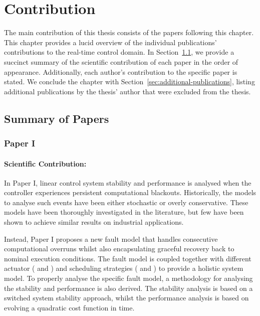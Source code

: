 \chapter{Contribution}%
\label{ch:contribution}%
%

The main contribution of this thesis consists of the  papers following this chapter.
This chapter provides a lucid overview of the individual publications' contributions to the real-time control domain.
In Section~\ref{sec:paper-summaries}, we provide a succinct summary of the scientific contribution of each paper in the order of appearance.
Additionally, each author's contribution to the specific paper is stated.
We conclude the chapter with Section~\ref{sec:additional-publications}, listing additional publications by the thesis' author that were excluded from the thesis.

\clearpage %

\section{Summary of Papers}%
\label{sec:paper-summaries}%
%
\subsection*{Paper I}%
%
\begin{quote}
\end{quote}

\subsubsection*{Scientific Contribution:}%
%
In Paper I, linear control system stability and performance is analysed when the controller experiences persistent computational blackouts.
Historically, the models to analyse such events have been either stochastic or overly conservative.
These models have been thoroughly investigated in the literature, but few have been shown to achieve similar results on industrial applications.

Instead, Paper I proposes a new fault model that handles consecutive computational overruns whilst also encapsulating graceful recovery back to nominal execution conditions.
The fault model is coupled together with different actuator (\tZ{} and \tH{}) and scheduling strategies (\tK{} and \tS{}) to provide a holistic system model.
To properly analyse the specific fault model, a methodology for analysing the stability and performance is also derived.
The stability analysis is based on a switched system stability approach, whilst the performance analysis is based on evolving a quadratic cost function in time.

